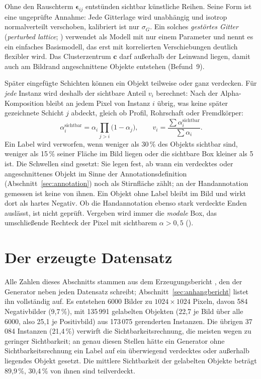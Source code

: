 Ohne den Rauschterm $\boldsymbol{\epsilon}_{ij}$ entstünden sichtbar künstliche
Reihen. Seine Form ist eine ungeprüfte Annahme: Jede Gitterlage wird unabhängig
und isotrop normalverteilt verschoben, kalibriert ist nur $\sigma_G$. Ein
solches \emph{gestörtes Gitter} (\emph{perturbed lattice};
\cite[Beispiel~2.11]{holroyd2013}) verwendet
\textcite[Abschnitte~4.4 und~5]{flimmel2026} als Modell mit nur einem Parameter
und nennt es ein einfaches Basismodell, das erst mit korrelierten Verschiebungen
deutlich flexibler wird. Das Clusterzentrum $\mathbf{c}$ darf außerhalb der
Leinwand liegen, damit auch am Bildrand angeschnittene Objekte entstehen
(Befund~9).

\label{sec:sichtbarkeit} Später
eingefügte Schichten können ein Objekt teilweise oder ganz verdecken. Für
\emph{jede} Instanz wird deshalb der sichtbare Anteil $v_i$ berechnet: Nach der
Alpha-Komposition \parencite{porter1984} bleibt an jedem Pixel von Instanz $i$
übrig, was keine später gezeichnete Schicht $j$ abdeckt, gleich ob Profil,
Rohrschaft oder Fremdkörper:
\begin{equation}
\alpha_i^{\text{sichtbar}} = \alpha_i \prod_{j > i} \big(1 - \alpha_j\big),
\qquad
v_i = \frac{\textstyle\sum \alpha_i^{\text{sichtbar}}}{\textstyle\sum \alpha_i}.
\label{eq:sichtbarkeit}
\end{equation}
Ein Label wird verworfen, wenn weniger als 30\,\% des Objekts sichtbar sind,
weniger als 15\,\% seiner Fläche im Bild liegen oder die sichtbare Box kleiner
als 5\px{} ist. Die Schwellen sind gesetzt: Sie legen fest, ab wann ein
verdecktes oder angeschnittenes Objekt im Sinne der Annotationsdefinition
(Abschnitt~\ref{sec:annotation}) noch als Stirnfläche zählt; an der
Handannotation gemessen ist keine von ihnen. Ein Objekt ohne Label bleibt im
Bild und wirkt dort als hartes Negativ. Ob die Handannotation ebenso stark
verdeckte Enden auslässt, ist nicht geprüft. Vergeben wird immer die
\emph{modale} Box, das umschließende Rechteck der Pixel mit sichtbarem
$\alpha > 0{,}5$ ().

\section{Der erzeugte Datensatz}
\label{sec:datensatz}

Alle Zahlen dieses Abschnitts stammen aus dem Erzeugungsbericht
, den der Generator neben jeden Datensatz
schreibt; Abschnitt~\ref{sec:anhangbericht} listet ihn vollständig auf.
Es entstehen 6000 Bilder zu $1024\times1024$ Pixeln, davon 584 Negativbilder
(9,7\,\%), mit 135\,991 gelabelten Objekten (22,7 je Bild über alle 6000, also
25,1 je Positivbild) aus 173\,075 gerenderten Instanzen. Die übrigen 37\,084
Instanzen (21,4\,\%) verwirft die Sichtbarkeitsrechnung, die meisten wegen zu
geringer Sichtbarkeit; an genau diesen Stellen hätte ein Generator ohne
Sichtbarkeitsrechnung ein Label auf ein überwiegend verdecktes oder außerhalb
liegendes Objekt gesetzt. Die mittlere Sichtbarkeit der
gelabelten Objekte beträgt 89,9\,\%, 30,4\,\% von ihnen sind teilverdeckt.

